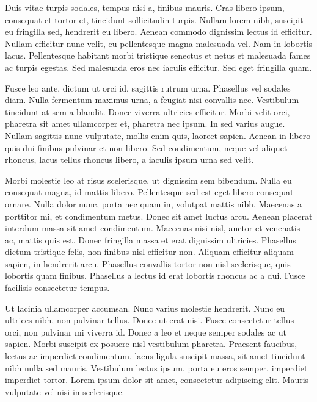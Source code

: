 \documentclass{report}
\begin{document}
	Duis vitae turpis sodales, tempus nisi a, finibus mauris. Cras libero ipsum, consequat et tortor et, tincidunt sollicitudin turpis. Nullam lorem nibh, suscipit eu fringilla sed, hendrerit eu libero. Aenean commodo dignissim lectus id efficitur. Nullam efficitur nunc velit, eu pellentesque magna malesuada vel. Nam in lobortis lacus. Pellentesque habitant morbi tristique senectus et netus et malesuada fames ac turpis egestas. Sed malesuada eros nec iaculis efficitur. Sed eget fringilla quam.
	
	Fusce leo ante, dictum ut orci id, sagittis rutrum urna. Phasellus vel sodales diam. Nulla fermentum maximus urna, a feugiat nisi convallis nec. Vestibulum tincidunt at sem a blandit. Donec viverra ultricies efficitur. Morbi velit orci, pharetra sit amet ullamcorper et, pharetra nec ipsum. In sed varius augue. Nullam sagittis nunc vulputate, mollis enim quis, laoreet sapien. Aenean in libero quis dui finibus pulvinar et non libero. Sed condimentum, neque vel aliquet rhoncus, lacus tellus rhoncus libero, a iaculis ipsum urna sed velit.
	
	Morbi molestie leo at risus scelerisque, ut dignissim sem bibendum. Nulla eu consequat magna, id mattis libero. Pellentesque sed est eget libero consequat ornare. Nulla dolor nunc, porta nec quam in, volutpat mattis nibh. Maecenas a porttitor mi, et condimentum metus. Donec sit amet luctus arcu. Aenean placerat interdum massa sit amet condimentum. Maecenas nisi nisl, auctor et venenatis ac, mattis quis est. Donec fringilla massa et erat dignissim ultricies. Phasellus dictum tristique felis, non finibus nisl efficitur non. Aliquam efficitur aliquam sapien, in hendrerit arcu. Phasellus convallis tortor non nisl scelerisque, quis lobortis quam finibus. Phasellus a lectus id erat lobortis rhoncus ac a dui. Fusce facilisis consectetur tempus.
	
	\vspace{3em}
	
	Ut lacinia ullamcorper accumsan.\hspace{3em} Nunc varius molestie hendrerit. Nunc eu ultrices nibh, non pulvinar tellus. Donec ut erat nisi. Fusce consectetur tellus orci, non pulvinar mi viverra id. Donec a leo et neque semper sodales ac ut sapien. Morbi suscipit ex posuere nisl vestibulum pharetra. Praesent faucibus, lectus ac imperdiet condimentum, lacus ligula suscipit massa, sit amet tincidunt nibh nulla sed mauris. Vestibulum lectus ipsum, porta eu eros semper, imperdiet imperdiet tortor. Lorem ipsum dolor sit amet, consectetur adipiscing elit. Mauris vulputate vel nisi in scelerisque.
\end{document}
